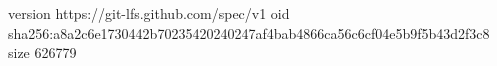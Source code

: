 version https://git-lfs.github.com/spec/v1
oid sha256:a8a2c6e1730442b70235420240247af4bab4866ca56c6cf04e5b9f5b43d2f3c8
size 626779
